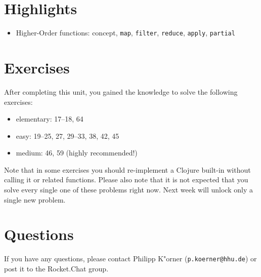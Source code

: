\documentclass[11pt,a4paper]{article}
\begin{document}
\section{Highlights}

\begin{itemize}
    \item Higher-Order functions: concept, \verb|map|, \verb|filter|, \verb|reduce|, \verb|apply|, \verb|partial|
\end{itemize}



\section{Exercises}
\begin{exercise}
    After completing this unit, you gained the knowledge to solve the following exercises:

    \begin{itemize}
        \item elementary: 17--18, 64
        \item easy: 19--25, 27, 29--33, 38, 42, 45
        \item medium: 46, 59 (highly recommended!)
    \end{itemize}

    Note that in some exercises you should re-implement a Clojure built-in without calling it or related functions.
    Please also note that it is not expected that you solve every single one of these problems right now.
    Next week will unlock only a single new problem.
\end{exercise}



	\section*{Questions}
	If you have any questions, please contact Philipp K"orner (\texttt{p.koerner@hhu.de}) or post it to the Rocket.Chat group.
\end{document}

